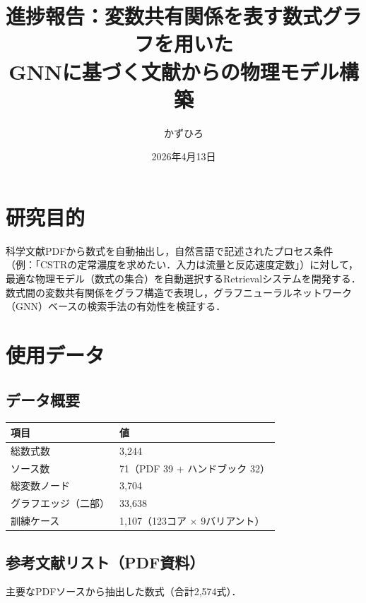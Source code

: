 \documentclass[11pt,a4paper]{ltjsarticle}
\title{{\sffamily 進捗報告：変数共有関係を表す数式グラフを用いた\\GNNに基づく文献からの物理モデル構築}}
\author{かずひろ}
\date{2026年4月13日}
\begin{document}
\maketitle


\section{研究目的}

科学文献PDFから数式を自動抽出し，自然言語で記述されたプロセス条件（例：「CSTRの定常濃度を求めたい．入力は流量と反応速度定数」）に対して，最適な物理モデル（数式の集合）を自動選択するRetrievalシステムを開発する．数式間の変数共有関係をグラフ構造で表現し，グラフニューラルネットワーク（GNN）ベースの検索手法の有効性を検証する．

\section{使用データ}

\subsection{データ概要}

\begin{table}[h]
\centering
\begin{tabular}{ll}
\toprule
項目 & 値 \\
\midrule
総数式数 & 3,244 \\
ソース数 & 71（PDF 39 + ハンドブック 32） \\
総変数ノード & 3,704 \\
グラフエッジ（二部） & 33,638 \\
訓練ケース & 1,107（123コア $\times$ 9バリアント） \\
\bottomrule
\end{tabular}
\end{table}

\subsection{参考文献リスト（PDF資料）}

主要なPDFソースから抽出した数式（合計2,574式）．
\end{document}
